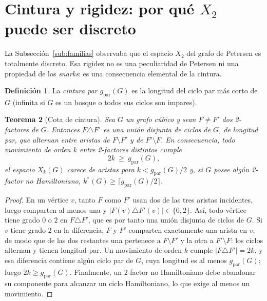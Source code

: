 \documentclass[11pt,a4paper]{article}
\newtheorem{teorema}{Teorema}[section]
\theoremstyle{definition}
\newtheorem{definicion}[teorema]{Definición}
\theoremstyle{remark}
\begin{document}
\section{Cintura y rigidez: por qué $X_2$ puede ser discreto}\label{sec:cintura}

La Subsección~\ref{sub:familias} observaba que el espacio $X_2$ del grafo de Petersen es totalmente discreto. Esa rigidez no es una peculiaridad de Petersen ni una propiedad de los \emph{snarks}: es una consecuencia elemental de la cintura.

\begin{definicion}
La \emph{cintura par} $g_{\mathrm{par}}(G)$ es la longitud del ciclo par más corto de $G$ (infinita si $G$ es un bosque o todos sus ciclos son impares).
\end{definicion}

\begin{teorema}[Cota de cintura]\label{thm:cintura}
Sea $G$ un grafo cúbico y sean $F\neq F'$ dos 2-factores de $G$. Entonces $F\triangle F'$ es una unión disjunta de ciclos de $G$, de longitud par, que alternan entre aristas de $F\setminus F'$ y de $F'\setminus F$. En consecuencia, todo movimiento de orden $k$ entre 2-factores distintos cumple
\[
2k\ \ge\ g_{\mathrm{par}}(G),
\]
el espacio $X_k(G)$ carece de aristas para $k<g_{\mathrm{par}}(G)/2$ y, si $G$ posee algún 2-factor no Hamiltoniano, $k^*(G)\ge\lceil g_{\mathrm{par}}(G)/2\rceil$.
\end{teorema}

\begin{proof}
En un vértice $v$, tanto $F$ como $F'$ usan dos de las tres aristas incidentes, luego comparten al menos una y $|F(v)\triangle F'(v)|\in\{0,2\}$. Así, todo vértice tiene grado $0$ o $2$ en $F\triangle F'$, que es por tanto una unión disjunta de ciclos de $G$. Si $v$ tiene grado $2$ en la diferencia, $F$ y $F'$ comparten exactamente una arista en $v$, de modo que de las dos restantes una pertenece a $F\setminus F'$ y la otra a $F'\setminus F$: los ciclos alternan y tienen longitud par. Un movimiento de orden $k$ cumple $|F\triangle F'|=2k$, y esa diferencia contiene algún ciclo par de $G$, cuya longitud es al menos $g_{\mathrm{par}}(G)$; luego $2k\ge g_{\mathrm{par}}(G)$. Finalmente, un 2-factor no Hamiltoniano debe abandonar su componente para alcanzar un ciclo Hamiltoniano, lo que exige al menos un movimiento.
\end{proof}
\end{document}

